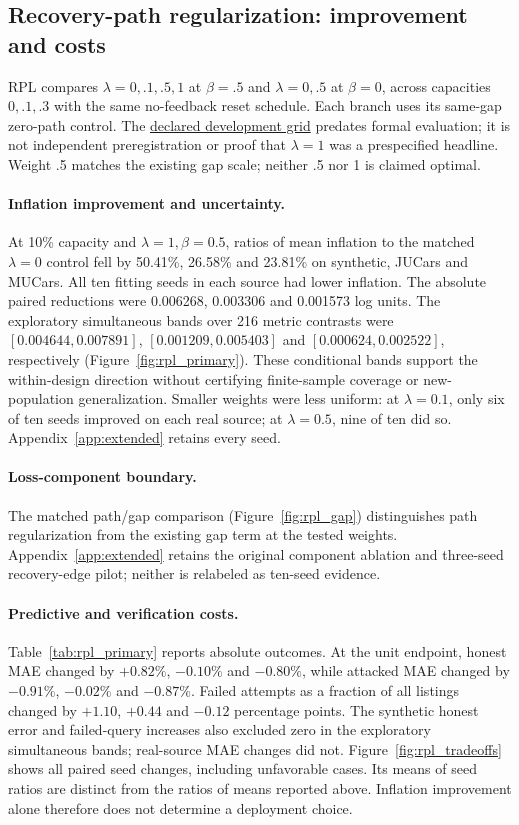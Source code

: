 \documentclass[11pt]{article}
\begin{document}
\subsection{Recovery-path regularization: improvement and costs}\label{sec:rpl_results}
RPL compares $\lambda=0,.1,.5,1$ at $\beta=.5$ and
$\lambda=0,.5$ at $\beta=0$, across capacities $0,.1,.3$ with the same
no-feedback reset schedule. Each branch uses its same-gap zero-path control.
The \href{https://github.com/T0Q0R/secondhand-valuation-research/commit/6643cbe3266f2c1548d987c2bb53e366e19ad3ef}{declared development grid}
predates formal evaluation; it is not independent preregistration or proof
that $\lambda=1$ was a prespecified headline. Weight .5 matches the existing
gap scale; neither .5 nor 1 is claimed optimal.

\paragraph{Inflation improvement and uncertainty.}
At 10\% capacity and $\lambda=1,\beta=0.5$, ratios of mean inflation to the
matched $\lambda=0$ control fell by 50.41\%, 26.58\% and 23.81\% on synthetic,
JUCars and MUCars. All ten fitting seeds in each source had lower inflation.
The absolute paired reductions were 0.006268, 0.003306 and 0.001573 log units.
The exploratory simultaneous bands over 216 metric contrasts were
$[0.004644,0.007891]$, $[0.001209,0.005403]$ and
$[0.000624,0.002522]$, respectively (Figure~\ref{fig:rpl_primary}). These
conditional bands support the within-design direction without certifying
finite-sample coverage or new-population generalization. Smaller weights were
less uniform: at $\lambda=0.1$, only six of ten seeds improved on each real
source; at $\lambda=0.5$, nine of ten did so. Appendix~\ref{app:extended}
retains every seed.

\paragraph{Loss-component boundary.}
The matched path/gap comparison (Figure~\ref{fig:rpl_gap}) distinguishes
path regularization from the existing gap term at the tested weights.
Appendix~\ref{app:extended} retains the original component ablation and
three-seed recovery-edge pilot; neither is relabeled as ten-seed evidence.

\paragraph{Predictive and verification costs.}
Table~\ref{tab:rpl_primary} reports absolute outcomes. At the unit endpoint,
honest MAE changed by $+0.82\%$, $-0.10\%$ and $-0.80\%$, while attacked MAE
changed by $-0.91\%$, $-0.02\%$ and $-0.87\%$. Failed attempts as a fraction of all listings
changed by $+1.10$, $+0.44$ and $-0.12$ percentage points. The synthetic honest
error and failed-query increases also excluded zero in the exploratory
simultaneous bands; real-source MAE changes did not. Figure~\ref{fig:rpl_tradeoffs}
shows all paired seed changes, including unfavorable cases. Its means of seed
ratios are distinct from the ratios of means reported above. Inflation
improvement alone therefore does not determine a deployment choice.
\end{document}
